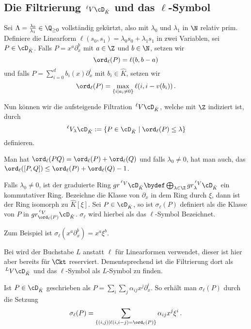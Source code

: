 \subsection{Die Filtrierung $\,^\ell V\cD_{\hat K}$ und das $\ell$-Symbol}
\begin{comment}
TODO: mache alle Linearformen $L$ zu $\ell$
\end{comment}
Sei $\Lambda=\frac{\lambda_0}{\lambda_1}\in \Q_{\geq 0}$ vollständig gekürtzt,
also mit $\lambda_0$ und $\lambda_1$ in $\N$ relativ prim. Definiere die
Linearform $\ell(s_0,s_1)=\lambda_0s_0+\lambda_1s_1$ in zwei Variablen, sei
$P\in\cD_{\hat K}$.  Falls $P=x^a\partial_x^b$ mit $a\in \Z$ und $b\in \N$,
setzen wir
\[
\ord_\ell(P)=\ell(b,b-a)
\]
und falls $P=\sum_{i=0}^d b_i(x)\partial_x^i$ mit $b_i\in\hat K$, setzen wir
\[
\ord_\ell(P)=\max_{\{i\mid a_i\neq 0\}} \ell(i,i-v(b_i))\,.
\]
\begin{defn}
\cite[Seite 25]{sabbah_cimpa90}
Nun können wir die aufsteigende Filtration $\,^\ell V\cD_{\hat K}$, welche mit
$\Z$ indiziert ist, durch
\[
\,^\ell V_\lambda\cD_{\hat K}:=\{P\in\cD_{\hat K}\mid \ord_\ell(P)\leq \lambda\}
\]
definieren.
\end{defn}
\begin{bem}
Man hat $\ord_\ell(PQ)=\ord_\ell(P)+\ord_\ell(Q)$ und falls $\lambda_0\neq 0$,
hat man auch, das $\ord_\ell([P,Q])\leq \ord_\ell(P)+\ord_\ell(Q)-1$.
\end{bem}
\begin{defn}
\cite[Seite 25]{sabbah_cimpa90}
Falls $\lambda_0\neq 0$, ist der graduierte Ring $gr^{\,^\ell V}\cD_{\hat
K}\bydef \bigoplus_{\lambda \in \Z}gr_\lambda^{\,^\ell V}\cD_{\hat K}$ ein
kommutativer Ring. Bezeichne die Klasse von $\partial_x$ in dem Ring durch
$\xi$, dann ist der Ring isomorph zu $\hat K[\xi]$.
%
Sei $P\in \cD_{\hat K}$, so ist $\sigma_\ell(P)$ definiert als die Klasse von
$P$ in $gr_{\ord_\ell(P)}^{\,^\ell V}\cD_{\hat K}$. $\sigma_\ell$ wird hierbei
als das $\ell$-Symbol Bezeichnet.
\end{defn}
Zum Beispiel ist $\sigma_\ell(x^a\partial_x^b)=x^a\xi^b$.
\begin{bem}
Bei \cite{sabbah_cimpa90} wird der Buchstabe $L$ anstatt $\ell$ für
Linearformen verwendet, dieser ist hier aber bereits für $\Ckt$ reserviert.
Dementsprechend ist die Filtrierung dort als $\,^L V\cD_{\hat K}$ und das
$\ell$-Symbol als $L$-Symbol zu finden.
\end{bem}
\begin{bem}
Ist $P\in \cD_{\hat K}$ geschrieben als
$P=\sum_i\sum_j\alpha_{ij}x^j\partial_x^i$.
So erhält man $\sigma_\ell(P)$ durch die Setzung
\[
\sigma_\ell(P)=\sum_{\{(i,j)\mid\ell(i,i-j)=\ord_\ell(P)\}}\alpha_{ij}x^j\xi^i \,.
\]
\end{bem}
